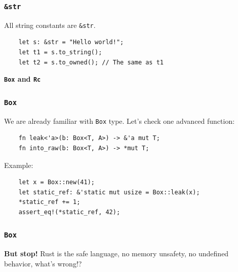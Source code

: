 \documentclass[aspectratio=1610,t]{beamer}
\begin{document}

\begin{frame}[fragile]
\frametitle{\texttt{\&str}}
All string constants are \texttt{\&str}.

\begin{verbatim}
    let s: &str = "Hello world!";
    let t1 = s.to_string();
    let t2 = s.to_owned(); // The same as t1
\end{verbatim}
\end{frame}


\begin{frame}[c]
\centering\Huge\textbf{\texttt{Box} and \texttt{Rc}}
\end{frame}


\begin{frame}[fragile]
\frametitle{\texttt{Box}}
We are already familiar with \texttt{Box} type. Let's check one advanced function:

\begin{verbatim}
    fn leak<'a>(b: Box<T, A>) -> &'a mut T;
    fn into_raw(b: Box<T, A>) -> *mut T;
\end{verbatim}

Example:

\begin{verbatim}
    let x = Box::new(41);
    let static_ref: &'static mut usize = Box::leak(x);
    *static_ref += 1;
    assert_eq!(*static_ref, 42);
\end{verbatim}
\end{frame}


\begin{frame}[fragile]
\frametitle{\texttt{Box}}
\textbf{But stop!} Rust is the safe language, no memory unsafety, no undefined behavior, what's wrong!?

\end{frame}

\end{document}
